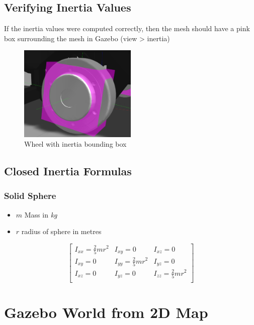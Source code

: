 \documentclass[11pt]{article}
\begin{document}
\subsection{Verifying Inertia Values}
If the inertia values were computed correctly, then the mesh should have a pink box surrounding the mesh in Gazebo (view > inertia)
\begin{figure}[H]
 \centering
 \includegraphics[width=0.5\textwidth]{images/inertiawheel}
 \caption{Wheel with inertia bounding box}
\end{figure}

\subsection{Closed Inertia Formulas}
\subsubsection{Solid Sphere}
\begin{itemize}
 \item {
       $m$ Mass in \emph{kg}
       }

 \item {
       $r$ radius of sphere in metres
       }
\end{itemize}

$$
 \begin{bmatrix}
  I_{xx}=\frac{2}{5}mr^2 & I_{xy}=0               & I_{xz}=0               \\
  I_{xy}=0               & I_{yy}=\frac{2}{5}mr^2 & I_{yz}=0               \\
  I_{xz}=0               & I_{yz}=0               & I_{zz}=\frac{2}{5}mr^2 \\
 \end{bmatrix}
$$


\section{Gazebo World from 2D Map}
\end{document}
